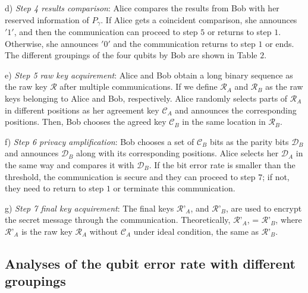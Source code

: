 \documentclass[a4paper,11pt]{article}
\begin{document}
d) \textit{Step 4 results comparison}: Alice compares the results from Bob with her reserved information of $P_\gamma$. If Alice gets a coincident comparison, she announces $'1'$, and then the communication can proceed to step $5$ or returns to step $1$. Otherwise, she announces $'0'$ and the communication returns to step $1$ or ends. The different groupings of the four qubits by Bob are shown in Table $2$.

e) \textit{Step 5 raw key acquirement}: Alice and Bob obtain a long binary sequence as the raw key $\mathcal{R}$ after multiple communications. If we define $\mathcal{R}_A$ and $\mathcal{R}_B$ as the raw keys belonging to Alice and Bob, respectively. Alice randomly selects parts of $\mathcal{R}_A$ in different positions as her agreement key $\mathcal{C}_A$ and announces the corresponding positions. Then, Bob chooses the agreed key $\mathcal{C}_B$ in the same location in $\mathcal{R}_B$.

f) \textit{Step 6 privacy amplification}: Bob chooses a set of $\mathcal{C}_B$ bits as the parity bits $\mathcal{D}_B$ and announces $\mathcal{D}_B$ along with its corresponding positions. Alice selects her $\mathcal{D}_A$ in the same way and compares it with $\mathcal{D}_B$. If the bit error rate is smaller than the threshold, the communication is secure and they can proceed to step $7$; if not, they need to return to step $1$ or terminate this communication.

g) \textit{Step 7 final key acquirement}: The final keys $\mathcal{R}’_A$, and $\mathcal{R}’_B$, are used to encrypt the secret message through the communication. Theoretically, $\mathcal{R}’_A$, = $\mathcal{R}’_B$, where $\mathcal{R}’_A$ is the raw key $\mathcal{R}_A$ without $\mathcal{C}_A$ under ideal condition, the same as $\mathcal{R}’_B$.

\subsection{Analyses of the qubit error rate with different groupings}
\end{document}
